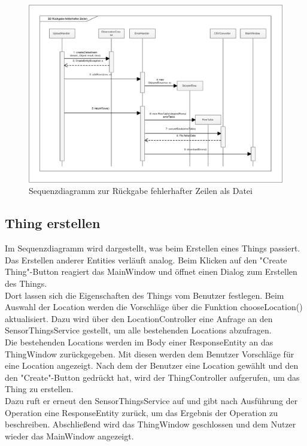 \vspace{\fill}
\begin{figure}[htbp]
\centering
\includegraphics[scale=0.5]{uml/SD_returnErrors.eps}
\caption{Sequenzdiagramm zur Rückgabe fehlerhafter Zeilen als Datei}
\end{figure}
\vspace{\fill}

\clearpage
\subsection{Thing erstellen}

Im Sequenzdiagramm wird dargestellt, was beim Erstellen eines Things passiert.
Das Erstellen anderer Entities verläuft analog.
Beim Klicken auf den "{Create Thing}"{-Button} reagiert das MainWindow und öffnet einen Dialog zum Erstellen des Things.\\
Dort lassen sich die Eigenschaften des Things vom Benutzer festlegen.
Beim Auswahl der Location werden die Vorschläge über die Funktion chooseLocation() aktualisiert.
Dazu wird über den LocationController eine Anfrage an den SensorThingsService gestellt, um alle bestehenden Locations abzufragen.\\
Die bestehenden Locations werden im Body einer ResponseEntity an das ThingWindow zurückgegeben.
Mit diesen werden dem Benutzer Vorschläge für eine Location angezeigt.
Nach dem der Benutzer eine Location gewählt und den den "{Create}"{-Button} gedrückt hat, wird der ThingController aufgerufen, um das Thing zu erstellen.
\\Dazu ruft er erneut den SensorThingsService auf und gibt nach Ausführung der Operation eine ResponseEntity zurück, um das Ergebnis der Operation zu beschreiben.
Abschließend wird das ThingWindow geschlossen und dem Nutzer wieder das MainWindow angezeigt.

